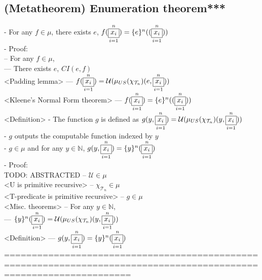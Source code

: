 \documentclass{book}
\newcommand{\vdc}[3]{\underset{#2}{\overset{#3}{\fbox{$#1$}}}}
\begin{document}
\subsection{(Metatheorem) Enumeration theorem***} %
	- For any $f \in \mu$, there exists $e$, $f(\vdc{x_i}{i=1}{n}) = \{e\}^n((\vdc{x_i}{i=1}{n}))$ \\
	- Proof: \\
		-- For any $f \in \mu$, \\
			--- There exists $e$, $CI(e, f)$ \\ <Padding lemma>
			--- $f(\vdc{x_i}{i=1}{n}) = \mathcal{U}(\mu_{US}(\chi_{\mathcal{T}_n})(e, \vdc{x_i}{i=1}{n}))$ \\ <Kleene's Normal Form theorem>
			--- $f(\vdc{x_i}{i=1}{n}) = \{e\}^n((\vdc{x_i}{i=1}{n}))$ \\ <Definition>
	- The function $g$ is defined as $g(y, \vdc{x_i}{i=1}{n}) = \mathcal{U}(\mu_{US}(\chi_{\mathcal{T}_n})(y, \vdc{x_i}{i=1}{n}))$ \\
	- $g$ outputs the computable function indexed by $y$ \\
	- $g \in \mu$	and for any $y \in \mathbb{N}$, $g(y, \vdc{x_i}{i=1}{n}) = \{y\}^n(\vdc{x_i}{i=1}{n})$ \\
	- Proof: \\ TODO: ABSTRACTED
		-- $\mathcal{U} \in \mu$ \\ <U is primitive recursive>
		-- $\chi_{\mathcal{T}_n} \in \mu$ \\ <T-predicate is primitive recursive>
		-- $g \in \mu$ \\ <Misc. theorems>
		-- For any $y \in \mathbb{N}$, \\
			--- $\{y\}^n(\vdc{x_i}{i=1}{n}) = \mathcal{U}(\mu_{US}(\chi_{\mathcal{T}_n})(y, \vdc{x_i}{i=1}{n}))$ \\ <Definition>
			--- $g(y, \vdc{x_i}{i=1}{n}) = \{y\}^n(\vdc{x_i}{i=1}{n})$ \\
	===================================================================================================================
\end{document}
